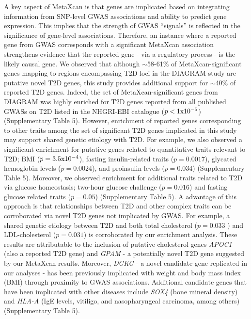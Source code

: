 \documentclass[10pt]{article}
\begin{document}
A key aspect of MetaXcan is that genes are implicated based on integrating information from SNP-level GWAS associations and ability to predict gene expression. This implies that the strength of GWAS “signals” is reflected in the significance of gene-level associations. Therefore, an instance where a reported gene from GWAS corresponds with a significant MetaXcan association strengthens evidence that the reported gene - via a regulatory process - is the likely causal gene.  We observed that although $\sim$58-61\% of MetaXcan-significant genes mapping to regions encompassing T2D loci in the DIAGRAM study are putative novel T2D genes, this study provides additional support for $\sim$40\% of reported T2D genes. Indeed, the set of MetaXcan-significant genes from DIAGRAM was highly enriched for T2D genes reported from all published GWASs on T2D listed in the NHGRI-EBI catalogue ($p < 1 \rm{x} 10^{-5}$) (Supplementary Table 5). However, enrichment of reported genes corresponding to other traits among the set of significant T2D genes implicated in this study may support shared genetic etiology with T2D. For example, we also observed a significant enrichment for putative genes related to quantitative traits relevant to T2D; BMI ($p = 3.5 \rm{x} 10^{-4}$), fasting insulin-related traits ($p = 0.0017$), glycated hemoglobin levels ($p = 0.0024$), and proinsulin levels ($p = 0.034$) (Supplementary Table 5).  Moreover, we observed enrichment for additional traits related to T2D via glucose homeostasis; two-hour glucose challenge ($p = 0.016$) and fasting glucose related traits ($p = 0.05$) (Supplementary Table 5). A advantage of this approach is that relationships between T2D and other complex traits can be corroborated via novel T2D genes not implicated by GWAS. For example, a shared genetic etiology between T2D and both total cholesterol ($p = 0.033$ ) and LDL-cholesterol ($p  = 0.031$) is corroborated by our enrichment analysis. These results are attributable to the inclusion of putative cholesterol genes \textit{APOC1} (also a reported T2D gene) and \textit{GPAM} - a potentially novel T2D gene suggested by our MetaXcan results. Moreover, \textit{DGKG} - a novel candidate gene replicated in our analyses - has been previously implicated with weight and body mass index (BMI) through proximity to GWAS associations. Additional candidate genes that have been implicated with other diseases include \textit{SOX4} (bone mineral density) and \textit{HLA-A} (IgE levels, vitiligo, and nasopharyngeal carcinoma, among others) (Supplementary Table 5). 
\end{document}
